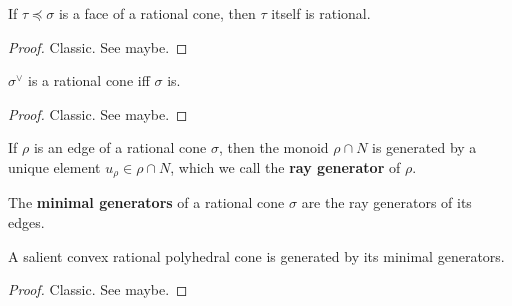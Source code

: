 \begin{lemma}
  \label{04-face-rat-cone}

  If $\tau \preceq \sigma$ is a face of a rational cone, then $\tau$ itself is rational.
\end{lemma}
\begin{proof}
  \uses{}

  Classic. See \cite{Oda_1988} maybe.
\end{proof}


\begin{lemma}
  \label{04-dual-rat-cone}

  $\sigma^\vee$ is a rational cone iff $\sigma$ is.
\end{lemma}
\begin{proof}
  \uses{}

  Classic. See \cite{Oda_1988} maybe.
\end{proof}


\begin{definition}
  \label{1-2-ray-gen}

  If $\rho$ is an edge of a rational cone $\sigma$, then the monoid $\rho \cap N$ is generated by a unique element $u_\rho \in \rho \cap N$, which we call the {\bf ray generator} of $\rho$.
\end{definition}


\begin{definition}
  \label{1-2-min-gen}

  The {\bf minimal generators} of a rational cone $\sigma$ are the ray generators of its edges.
\end{definition}


\begin{lemma}
  \label{05-cone-hull-min-gen}

  A salient convex rational polyhedral cone is generated by its minimal generators.
\end{lemma}
\begin{proof}
  \uses{}

  Classic. See \cite{Oda_1988} maybe.
\end{proof}


